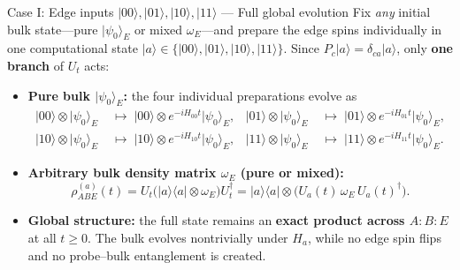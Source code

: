\documentclass[aspectratio=169,11pt]{beamer}
\newcommand{\ket}[1]{\lvert #1\rangle}
\newcommand{\bra}[1]{\langle #1\rvert}
\begin{document}
\begin{frame}{Case I: Edge inputs $\ket{00},\ket{01},\ket{10},\ket{11}$ --- Full global evolution}
\small
Fix \emph{any} initial bulk state---pure $\ket{\psi_0}_E$ or mixed $\omega_E$---and prepare the edge spins individually in one computational state $\ket a\in\{\ket{00},\ket{01},\ket{10},\ket{11}\}$. Since $P_c\ket a=\delta_{ca}\ket a$, only \textbf{one branch} of $U_t$ acts:
\medskip
\begin{itemize}\setlength\itemsep{6pt}
\item \textbf{Pure bulk $\ket{\psi_0}_E$:} the four individual preparations evolve as
\begin{align*}
\ket{00}\otimes\ket{\psi_0}_E &\;\longmapsto\; \ket{00}\otimes e^{-iH_{00}t}\ket{\psi_0}_E, &
\ket{01}\otimes\ket{\psi_0}_E &\;\longmapsto\; \ket{01}\otimes e^{-iH_{01}t}\ket{\psi_0}_E,\\[2pt]
\ket{10}\otimes\ket{\psi_0}_E &\;\longmapsto\; \ket{10}\otimes e^{-iH_{10}t}\ket{\psi_0}_E, &
\ket{11}\otimes\ket{\psi_0}_E &\;\longmapsto\; \ket{11}\otimes e^{-iH_{11}t}\ket{\psi_0}_E.
\end{align*}
\item \textbf{Arbitrary bulk density matrix $\omega_E$ (pure or mixed):}
\[
\boxed{\rho_{ABE}^{(a)}(t)=U_t\bigl(\ket a\bra a\otimes\omega_E\bigr)U_t^\dagger
=\ket a\bra a\otimes\bigl(U_a(t)\,\omega_E\,U_a(t)^\dagger\bigr).}
\]
\item \textbf{Global structure:} the full state remains an \textbf{exact product across $A:B:E$} at all $t\ge0$. The bulk evolves nontrivially under $H_a$, while no edge spin flips and no probe--bulk entanglement is created.
\end{itemize}
\end{frame}
\end{document}
